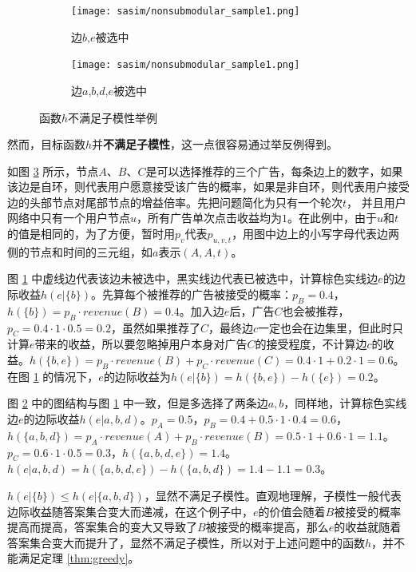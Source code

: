 \begin{figure}[htbp]
    \centering
    \begin{subfigure}[t]{0.44\linewidth}
        \centering
        \texttt{[image: sasim/nonsubmodular\_sample1.png]}
        \caption{边$b$,$e$被选中\label{fig:nonsub_a}}
    \end{subfigure}
    \quad
    \begin{subfigure}[t]{0.44\linewidth}
        \centering
        \texttt{[image: sasim/nonsubmodular\_sample1.png]}
        \caption{边$a$,$b$,$d$,$e$被选中\label{fig:nonsub_b}}
    \end{subfigure}

    \caption{\label{fig:nonsub_sample}函数$h$不满足子模性举例}
\end{figure}


然而，目标函数$h$并{\bfseries 不满足子模性}，这一点很容易通过举反例得到。

如图 \ref{fig:nonsub_sample} 所示，节点$A$、$B$、$C$是可以选择推荐的三个广告，每条边上的数字，如果该边是自环，则代表用户愿意接受该广告的概率，如果是非自环，则代表用户接受边的头部节点对尾部节点的增益倍率。先把问题简化为只有一个轮次$t$， 并且用户网络中只有一个用户节点$u$，所有广告单次点击收益均为$1$。在此例中，由于$u$和$t$的值是相同的，为了方便，暂时用$p_{v}$代表$p_{u,v,t}$，用图中边上的小写字母代表边两侧的节点和时间的三元组，如$a$表示$(A,A,t)$。

图 \ref{fig:nonsub_a} 中虚线边代表该边未被选中，黑实线边代表已被选中，计算棕色实线边$e$的边际收益$h(e|\{b\})$。先算每个被推荐的广告被接受的概率：$p_B=0.4$，$h(\{b\})=p_B \cdot revenue(B)=0.4$。加入边$e$后，广告$C$也会被推荐，$p_C=0.4 \cdot 1 \cdot 0.5=0.2$，虽然如果推荐了$C$，最终边$c$一定也会在边集里，但此时只计算$e$带来的收益，所以要忽略掉用户本身对广告$C$的接受程度，不计算边$c$的收益。$h(\{b,e\})=p_B\cdot revenue(B)+p_C\cdot revenue(C)=0.4\cdot 1+0.2\cdot 1=0.6$。在图 \ref{fig:nonsub_a} 的情况下，$e$的边际收益为$h(e|\{b\})=h(\{b,e\})-h(\{e\})=0.2$。

图 \ref{fig:nonsub_b} 中的图结构与图 \ref{fig:nonsub_a} 中一致，但是多选择了两条边$a,b$，同样地，计算棕色实线边$e$的边际收益$h(e|{a,b,d})$。$p_A=0.5$，$p_B=0.4+0.5\cdot 1\cdot 0.4=0.6$，$h(\{a,b,d\})=p_A\cdot revenue(A)+p_B\cdot revenue(B)=0.5\cdot 1 + 0.6 \cdot 1 = 1.1$。$p_C=0.6 \cdot 1\cdot 0.5 = 0.3$，$h(\{a,b,d,e\})=1.4$。$h(e|{a,b,d})=h(\{a,b,d,e\})-h(\{a,b,d\})=1.4-1.1=0.3$。

$h(e|\{b\})\le h(e|\{a,b,d\})$，显然不满足子模性。直观地理解，子模性一般代表边际收益随答案集合变大而递减，在这个例子中，$e$的价值会随着$B$被接受的概率提高而提高，答案集合的变大又导致了$B$被接受的概率提高，那么$e$的收益就随着答案集合变大而提升了，显然不满足子模性，所以对于上述问题中的函数$h$，并不能满足定理 \ref{thm:greedy}。

